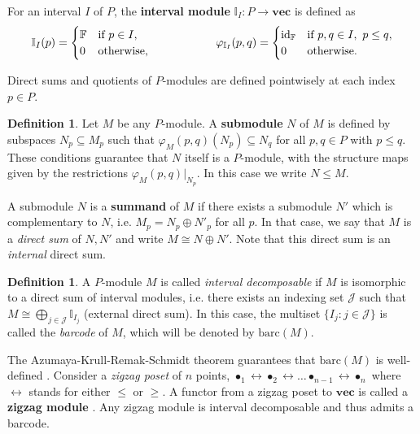 \documentclass[11pt]{article}
\theoremstyle{definition}
\newtheorem{definition}[theorem]{Definition}
\newcommand{\I}{\mathbb{I}}
\newcommand{\Pb}{P}
\newcommand{\vect}{\mathbf{vec}}
\newcommand{\barc}{\mathrm{barc}}
\begin{document}
For an interval $I$ of $\Pb$, the \textbf{interval module} $\I_I:\Pb\rightarrow \vect$ is defined as
\[\I_I(p)=\begin{cases}
\mathbb{F}&\mbox{if}\ p\in I,\\0
&\mbox{otherwise,} 
\end{cases}\hspace{20mm} \varphi_{\I_I}(p,q)=\begin{cases} \mathrm{id}_\mathbb{F}& \mbox{if} \,\,p,q\in I,\ p\leq q,\\ 0&\mbox{otherwise.}\end{cases}\]

Direct sums and quotients of $\Pb$-modules are defined pointwisely at each index $p\in \Pb$.

\begin{definition}\label{def:submodules and summands}Let $M$ be any $\Pb$-module. A \textbf{submodule} $N$ of $M$ is defined by subspaces $N_p\subseteq M_p$ such that $\varphi_M(p,q)(N_p)\subseteq N_q$ for all $p,q\in \Pb$ with $p\leq q$. These conditions guarantee that $N$ itself is a $\Pb$-module, with the structure maps given by the restrictions $\varphi_M(p,q)|_{N_p}$. In this case we write  $N\leq M$.

A submodule $N$ is a \textbf{summand} of $M$ if there exists a submodule $N'$ which is complementary to $N$, i.e. $M_p=N_p\oplus N'_p$ for all $p$. In that case, we say that $M$ is a \emph{direct sum} of $N,N'$ and write $M\cong N\oplus N'$.  Note that this direct sum is an \emph{internal} direct sum. 
\end{definition}

\begin{definition}\label{def:interval decomposable} A $\Pb$-module $M$ is called \emph{interval decomposable} if $M$ is isomorphic to a direct sum of interval modules, i.e. there exists an indexing set $\mathcal{J}$ such that $M\cong \bigoplus_{j\in \mathcal{J}}\I_{I_{j}}$ (external direct sum). In this case, the multiset $\{I_j: j\in \mathcal{J}\}$ is  called the \emph{barcode} of $M$, which will be denoted by $\barc(M)$.
\end{definition}
The Azumaya-Krull-Remak-Schmidt theorem guarantees that $\barc(M)$ is well-defined \cite{azumaya1950corrections}.
Consider a \textit{zigzag poset} of $n$ points, $    \bullet_{1}\leftrightarrow \bullet_{2} \leftrightarrow \ldots \bullet_{n-1} \leftrightarrow \bullet_n$
where $\leftrightarrow$ stands for either $\leq$ or $\geq$. A functor from a zigzag poset to $\vect$ is called a \textbf{zigzag module}  \cite{carlsson2010zigzag}. Any zigzag module is interval decomposable \cite{gabrielsthm} and thus admits a barcode.
\end{document}
